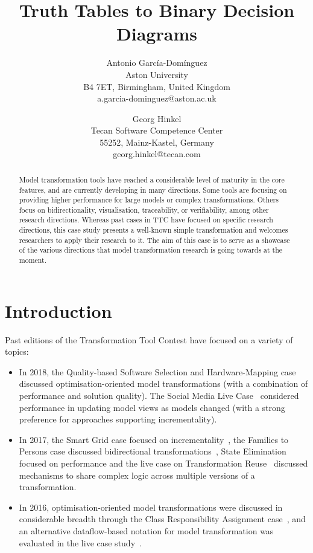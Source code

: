\documentclass[a4paper]{article}
\title{Truth Tables to Binary Decision Diagrams}
\author{
  Antonio García-Domínguez\\
  Aston University\\
  B4 7ET, Birmingham, United Kingdom\\
  a.garcia-dominguez@aston.ac.uk
  \and
  Georg Hinkel\\
  Tecan Software Competence Center\\
  55252, Mainz-Kastel, Germany\\
  georg.hinkel@tecan.com
}
\begin{document}
\maketitle

\begin{abstract}
  Model transformation tools have reached a considerable level of maturity in
  the core features, and are currently developing in many directions. Some tools
  are focusing on providing higher performance for large models or complex
  transformations. Others focus on bidirectionality, visualisation,
  traceability, or verifiability, among other research directions. Whereas past
  cases in TTC have focused on specific research directions, this case study
  presents a well-known simple transformation and welcomes researchers to apply
  their research to it. The aim of this case is to serve as a showcase of the
  various directions that model transformation research is going towards at the
  moment.
\end{abstract}

\section{Introduction}

Past editions of the Transformation Tool Contest have focused on a variety of
topics:
\begin{itemize}
\item In 2018, the Quality-based Software Selection and Hardware-Mapping
  case~\cite{gotz_quality-based_2018} discussed optimisation-oriented model
  transformations (with a combination of performance and solution quality). The
  Social Media Live Case~\cite{hinkel_ttc_2018} considered performance in
  updating model views as models changed (with a strong preference for
  approaches supporting incrementality).

\item In 2017, the Smart Grid case focused on
  incrementality~\cite{hinkel_ttc_2017}, the Families to Persons case discussed
  bidirectional transformations~\cite{anjorin_families_2017}, State Elimination
  focused on performance and the live case on Transformation
  Reuse~\cite{live2017} discussed mechanisms to share complex logic across
  multiple versions of a transformation.

\item In 2016, optimisation-oriented model transformations were discussed in
  considerable breadth through the Class Responsibility Assignment
  case~\cite{fleck_class_2016}, and an alternative dataflow-based notation for
  model transformation was evaluated in the live case study~\cite{live2016}.
\end{itemize}
\end{document}
